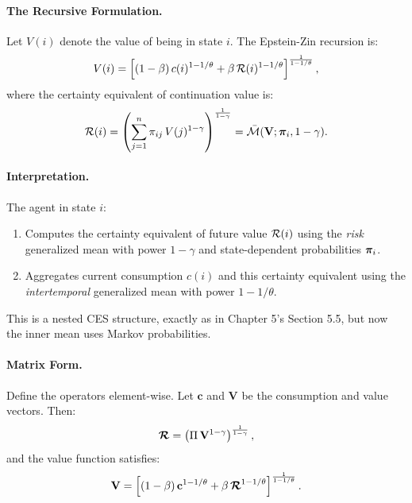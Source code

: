 \paragraph{The Recursive Formulation.}
Let $V(i)$ denote the value of being in state $i$. The Epstein-Zin recursion is:
\begin{equation}
V(i) = \left[ (1-\beta) \, c(i)^{1-1/\theta} + \beta \, \mathcal{R}(i)^{1-1/\theta} \right]^{\frac{1}{1-1/\theta}},
\label{eq:ez-recursion}
\end{equation}
where the certainty equivalent of continuation value is:
\begin{equation}
\mathcal{R}(i) = \left( \sum_{j=1}^{n} \pi_{ij} \, V(j)^{1-\gamma} \right)^{\frac{1}{1-\gamma}} = \bar{\mathcal{M}}(\mathbf{V}; \bm{\pi}_i, 1-\gamma).
\label{eq:ez-ce}
\end{equation}

\paragraph{Interpretation.}
The agent in state $i$:
\begin{enumerate}[label=(\arabic*)]
\item Computes the certainty equivalent of future value $\mathcal{R}(i)$ using the \emph{risk} generalized mean with power $1-\gamma$ and state-dependent probabilities $\bm{\pi}_i$.
\item Aggregates current consumption $c(i)$ and this certainty equivalent using the \emph{intertemporal} generalized mean with power $1-1/\theta$.
\end{enumerate}

This is a nested CES structure, exactly as in Chapter 5's Section 5.5, but now the inner mean uses Markov probabilities.

\paragraph{Matrix Form.}
Define the operators element-wise. Let $\mathbf{c}$ and $\mathbf{V}$ be the consumption and value vectors. Then:
\begin{equation}
\boldsymbol{\mathcal{R}} = \left( \Pi \, \mathbf{V}^{1-\gamma} \right)^{\frac{1}{1-\gamma}},
\label{eq:ez-ce-matrix}
\end{equation}
and the value function satisfies:
\begin{equation}
\mathbf{V} = \left[ (1-\beta) \, \mathbf{c}^{1-1/\theta} + \beta \, \boldsymbol{\mathcal{R}}^{1-1/\theta} \right]^{\frac{1}{1-1/\theta}}.
\label{eq:ez-value-matrix}
\end{equation}

